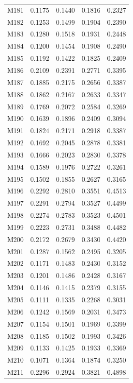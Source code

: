 \begin{longtable}{lrrrr}
M181 & 0.1175 & 0.1440 & 0.1816 & 0.2327 \\
M182 & 0.1253 & 0.1499 & 0.1904 & 0.2390 \\
M183 & 0.1280 & 0.1518 & 0.1931 & 0.2448 \\
M184 & 0.1200 & 0.1454 & 0.1908 & 0.2490 \\
M185 & 0.1192 & 0.1422 & 0.1825 & 0.2409 \\
M186 & 0.2109 & 0.2391 & 0.2771 & 0.3395 \\
M187 & 0.1885 & 0.2175 & 0.2656 & 0.3387 \\
M188 & 0.1862 & 0.2167 & 0.2633 & 0.3347 \\
M189 & 0.1769 & 0.2072 & 0.2584 & 0.3269 \\
M190 & 0.1639 & 0.1896 & 0.2409 & 0.3094 \\
M191 & 0.1824 & 0.2171 & 0.2918 & 0.3387 \\
M192 & 0.1692 & 0.2045 & 0.2878 & 0.3381 \\
M193 & 0.1666 & 0.2023 & 0.2830 & 0.3378 \\
M194 & 0.1589 & 0.1976 & 0.2722 & 0.3261 \\
M195 & 0.1502 & 0.1855 & 0.2627 & 0.3165 \\
M196 & 0.2292 & 0.2810 & 0.3551 & 0.4513 \\
M197 & 0.2291 & 0.2794 & 0.3527 & 0.4499 \\
M198 & 0.2274 & 0.2783 & 0.3523 & 0.4501 \\
M199 & 0.2223 & 0.2731 & 0.3488 & 0.4482 \\
M200 & 0.2172 & 0.2679 & 0.3430 & 0.4420 \\
M201 & 0.1287 & 0.1562 & 0.2495 & 0.3205 \\
M202 & 0.1171 & 0.1483 & 0.2430 & 0.3152 \\
M203 & 0.1201 & 0.1486 & 0.2428 & 0.3167 \\
M204 & 0.1146 & 0.1415 & 0.2379 & 0.3155 \\
M205 & 0.1111 & 0.1335 & 0.2268 & 0.3031 \\
M206 & 0.1242 & 0.1569 & 0.2031 & 0.3473 \\
M207 & 0.1154 & 0.1501 & 0.1969 & 0.3399 \\
M208 & 0.1185 & 0.1502 & 0.1993 & 0.3426 \\
M209 & 0.1133 & 0.1425 & 0.1933 & 0.3369 \\
M210 & 0.1071 & 0.1364 & 0.1874 & 0.3250 \\
M211 & 0.2296 & 0.2924 & 0.3821 & 0.4898 \\

\end{longtable}
